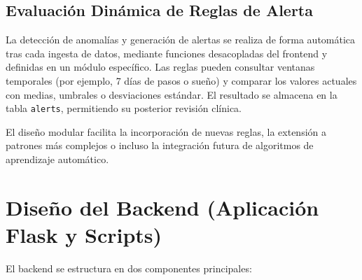 \subsection{Evaluación Dinámica de Reglas de Alerta}
La detección de anomalías y generación de alertas se realiza de forma automática tras cada ingesta de datos, mediante funciones desacopladas del frontend y definidas en un módulo específico. Las reglas pueden consultar ventanas temporales (por ejemplo, 7 días de pasos o sueño) y comparar los valores actuales con medias, umbrales o desviaciones estándar. El resultado se almacena en la tabla \texttt{alerts}, permitiendo su posterior revisión clínica.

El diseño modular facilita la incorporación de nuevas reglas, la extensión a patrones más complejos o incluso la integración futura de algoritmos de aprendizaje automático.


\section{Diseño del Backend (Aplicación Flask y Scripts)}
\label{sec:diseno_backend}

El backend se estructura en dos componentes principales:

